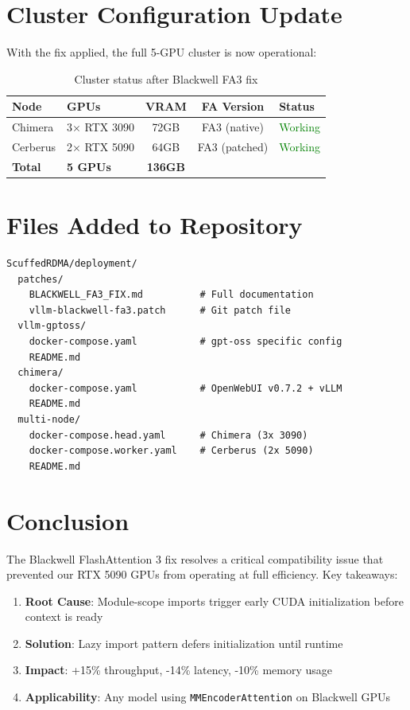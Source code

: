 \documentclass[10pt,letterpaper]{article}
\begin{document}
\section{Cluster Configuration Update}

With the fix applied, the full 5-GPU cluster is now operational:

\begin{table}[H]
\centering
\small
\begin{tabular}{@{}llccl@{}}
\toprule
\textbf{Node} & \textbf{GPUs} & \textbf{VRAM} & \textbf{FA Version} & \textbf{Status} \\
\midrule
Chimera & 3$\times$ RTX 3090 & 72GB & FA3 (native) & \textcolor{green}{Working} \\
Cerberus & 2$\times$ RTX 5090 & 64GB & FA3 (patched) & \textcolor{green}{Working} \\
\midrule
\textbf{Total} & \textbf{5 GPUs} & \textbf{136GB} & & \\
\bottomrule
\end{tabular}
\caption{Cluster status after Blackwell FA3 fix}
\end{table}

\section{Files Added to Repository}

\begin{lstlisting}
ScuffedRDMA/deployment/
  patches/
    BLACKWELL_FA3_FIX.md          # Full documentation
    vllm-blackwell-fa3.patch      # Git patch file
  vllm-gptoss/
    docker-compose.yaml           # gpt-oss specific config
    README.md
  chimera/
    docker-compose.yaml           # OpenWebUI v0.7.2 + vLLM
    README.md
  multi-node/
    docker-compose.head.yaml      # Chimera (3x 3090)
    docker-compose.worker.yaml    # Cerberus (2x 5090)
    README.md
\end{lstlisting}

\section{Conclusion}

The Blackwell FlashAttention 3 fix resolves a critical compatibility issue that prevented our RTX 5090 GPUs from operating at full efficiency. Key takeaways:

\begin{enumerate}[noitemsep]
    \item \textbf{Root Cause}: Module-scope imports trigger early CUDA initialization before context is ready
    \item \textbf{Solution}: Lazy import pattern defers initialization until runtime
    \item \textbf{Impact}: +15\% throughput, -14\% latency, -10\% memory usage
    \item \textbf{Applicability}: Any model using \texttt{MMEncoderAttention} on Blackwell GPUs
\end{enumerate}
\end{document}
